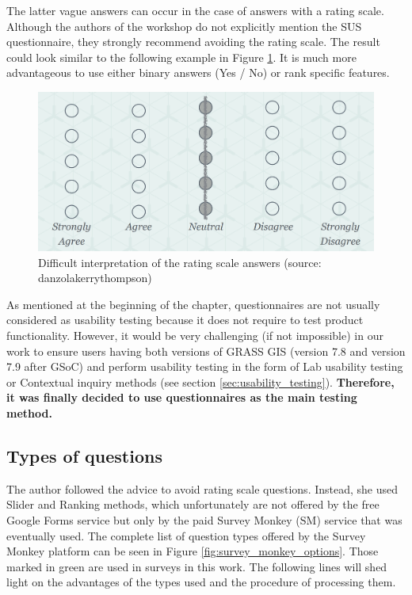 \documentclass[a4paper,10pt,twoside]{article}
\begin{document}
\noindent The latter vague answers can occur in the case of answers
with a rating scale. Although the authors of the workshop do not
explicitly mention the SUS questionnaire, they strongly recommend
avoiding the rating scale. The result could look similar to the
following example in Figure \ref{fig:blur_scale}. It is much more
advantageous to use either binary answers (Yes / No) or rank specific
features.

\vspace{0.3cm}
\begin{figure}[hbt!] 
\begin{center}
\includegraphics[width=12.5cm]{../pictures/blur_scale.png} 
\caption[Difficult interpretation of the rating scale answers]{Difficult interpretation of the rating scale answers (source: danzolakerrythompson)}
\label{fig:blur_scale}
\end{center}
\end{figure}

\noindent As mentioned at the beginning of the chapter, questionnaires
are not usually considered as usability testing because it does not
require to test product functionality. However, it would be very
challenging (if not impossible) in our work to ensure users having
both versions of GRASS GIS (version 7.8 and version 7.9 after GSoC)
and perform usability testing in the form of Lab usability testing or
Contextual inquiry methods (see section \ref{sec:usability_testing}). 
\textbf{Therefore, it was finally decided
  to use questionnaires as the main testing method.}

\subsection{Types of questions}

\noindent The author followed the advice to avoid rating scale
questions. Instead, she used Slider and Ranking methods, which
unfortunately are not offered by the free Google Forms service but
only by the paid Survey Monkey (SM) service that was eventually
used. The complete list of question types offered by the Survey Monkey
platform can be seen in Figure \ref{fig:survey_monkey_options}. Those
marked in green are used in surveys in this work. The following lines
will shed light on the advantages of the types used and the procedure
of processing them.
\end{document}
